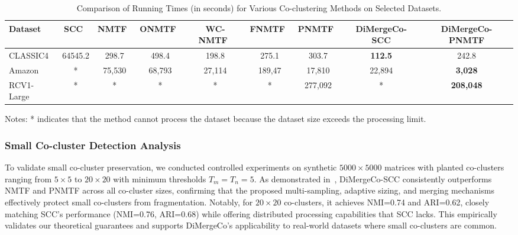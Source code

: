 \documentclass[journal]{IEEEtran}
\renewcommand{\cite}[1]{~\autocite{#1}}
\begin{document}
\begin{table}[htbp]
    \centering
    \caption{Comparison of Running Times (in seconds) for Various Co-clustering Methods on Selected Datasets.}
    \label{tab:running-time}
    \begin{tabular}{@{} l cccccccc @{}}
        \toprule
        Dataset    & SCC\cite{dhillon2001CoclusteringDocumentsWords}
                   & NMTF\cite{long2005CoclusteringBlockValue}
                   & ONMTF\cite{ding2006OrthogonalNonnegativeMatrix}
                   & WC-NMTF\cite{salah2018WordCooccurrenceRegularized}
                   & FNMTF\cite{kim2011FastNonnegativeMatrix}
                   & PNMTF\cite{chen2023ParallelNonNegativeMatrix}      & \textbf{DiMergeCo-SCC} & \textbf{DiMergeCo-PNMTF}                                                                 \\
        \midrule
        CLASSIC4   & 64545.2                                            & 298.7                  & 498.4                    & 198.8  & 275.1  & 303.7   & \textbf{112.5} & 242.8            \\
        Amazon     & *                                                  & 75,530                 & 68,793                   & 27,114 & 189,47 & 17,810  & 22,894         & \textbf{3,028}   \\
        RCV1-Large & *                                                  & *                      & *                        & *      & *      & 277,092 & *              & \textbf{208,048} \\
        \bottomrule
    \end{tabular}
    \begin{tablenotes}
        \small
        \item Notes: * indicates that the method cannot process the dataset because the dataset size exceeds the processing limit.
    \end{tablenotes}
\end{table}

\subsubsection{Small Co-cluster Detection Analysis}
{\color{blue}
    To validate small co-cluster preservation, we conducted controlled experiments on synthetic $5000 \times 5000$ matrices with planted co-clusters ranging from $5 \times 5$ to $20 \times 20$ with minimum thresholds $T_m = T_n = 5$. As demonstrated in~, DiMergeCo-SCC consistently outperforms NMTF and PNMTF across all co-cluster sizes, confirming that the proposed multi-sampling, adaptive sizing, and merging mechanisms effectively protect small co-clusters from fragmentation. Notably, for $20 \times 20$ co-clusters, it achieves NMI=0.74 and ARI=0.62, closely matching SCC's performance (NMI=0.76, ARI=0.68) while offering distributed processing capabilities that SCC lacks. This empirically validates our theoretical guarantees and supports DiMergeCo's applicability to real-world datasets where small co-clusters are common.
}
\end{document}
